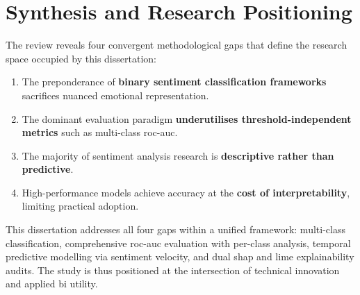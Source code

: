\section{Synthesis and Research Positioning}

The review reveals four convergent methodological gaps that define the research space occupied by this dissertation:
\begin{enumerate}
  \item The preponderance of \textbf{binary sentiment classification frameworks} sacrifices nuanced emotional representation.
  \item The dominant evaluation paradigm \textbf{underutilises threshold-independent metrics} such as multi-class \gls{roc}-\gls{auc}.
  \item The majority of sentiment analysis research is \textbf{descriptive rather than predictive}.
  \item High-performance models achieve accuracy at the \textbf{cost of interpretability}, limiting practical adoption.
\end{enumerate}

This dissertation addresses all four gaps within a unified framework: multi-class classification, comprehensive \gls{roc}-\gls{auc} evaluation with per-class analysis, temporal predictive modelling via sentiment velocity, and dual \gls{shap} and \gls{lime} explainability audits. The study is thus positioned at the intersection of technical innovation and applied \gls{bi} utility.
